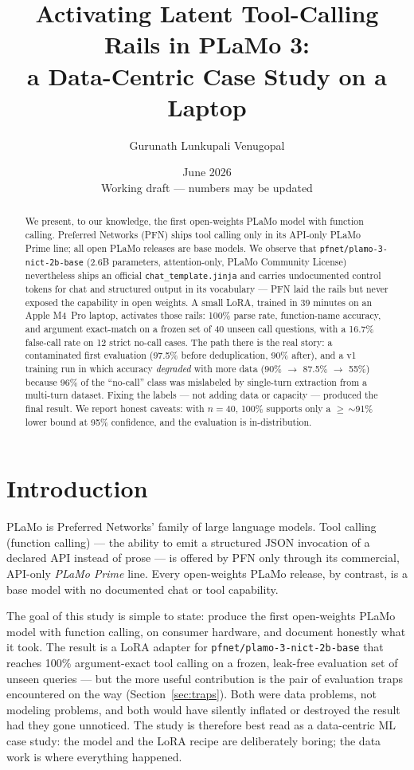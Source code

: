 \documentclass[10pt]{article}
\title{Activating Latent Tool-Calling Rails in PLaMo 3:\\
a Data-Centric Case Study on a Laptop}
\author{Gurunath Lunkupali Venugopal}
\date{June 2026 \\ \small Working draft --- numbers may be updated}
\begin{document}
\maketitle

\begin{abstract}
We present, to our knowledge, the first open-weights PLaMo model with function calling.
Preferred Networks (PFN) ships tool calling only in its API-only PLaMo Prime line; all
open PLaMo releases are base models. We observe that \texttt{pfnet/plamo-3-nict-2b-base}
(2.6B parameters, attention-only, PLaMo Community License) nevertheless ships an official
\texttt{chat\_template.jinja} and carries undocumented control tokens for chat and
structured output in its vocabulary --- PFN laid the rails but never exposed the capability
in open weights. A small LoRA, trained in 39 minutes on an Apple M4~Pro laptop, activates
those rails: 100\% parse rate, function-name accuracy, and argument exact-match on a
frozen set of 40 unseen call questions, with a 16.7\% false-call rate on 12 strict
no-call cases. The path there is the real story: a contaminated first evaluation
(97.5\% before deduplication, 90\% after), and a v1 training run in which accuracy
\emph{degraded} with more data (90\% $\rightarrow$ 87.5\% $\rightarrow$ 55\%) because 96\%
of the ``no-call'' class was mislabeled by single-turn extraction from a multi-turn dataset.
Fixing the labels --- not adding data or capacity --- produced the final result. We report
honest caveats: with $n=40$, 100\% supports only a $\geq$\,$\sim$91\% lower bound at 95\%
confidence, and the evaluation is in-distribution.
\end{abstract}

\section{Introduction}

PLaMo is Preferred Networks' family of large language models. Tool calling (function
calling) --- the ability to emit a structured JSON invocation of a declared API instead of
prose --- is offered by PFN only through its commercial, API-only \emph{PLaMo Prime} line.
Every open-weights PLaMo release, by contrast, is a base model with no documented chat or
tool capability.

The goal of this study is simple to state: produce the first open-weights PLaMo model with
function calling, on consumer hardware, and document honestly what it took. The result is
a LoRA adapter for \texttt{pfnet/plamo-3-nict-2b-base} that reaches 100\% argument-exact
tool calling on a frozen, leak-free evaluation set of unseen queries --- but the more
useful contribution is the pair of evaluation traps encountered on the way
(Section~\ref{sec:traps}). Both were data problems, not modeling problems, and both would
have silently inflated or destroyed the result had they gone unnoticed. The study is
therefore best read as a data-centric ML case study: the model and the LoRA recipe are
deliberately boring; the data work is where everything happened.
\end{document}
